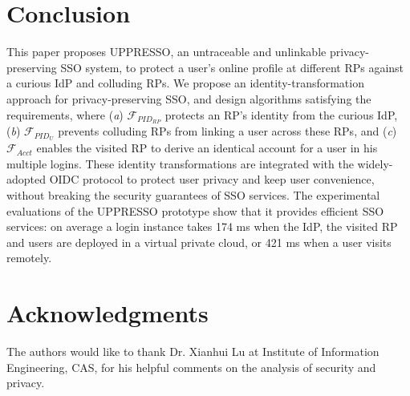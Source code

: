 \section{Conclusion}
\label{sec:conclusion}
This paper proposes UPPRESSO, an untraceable and unlinkable privacy-preserving SSO system,
 to protect a user's online profile at different RPs against a curious IdP and colluding RPs.
We propose an identity-transformation approach for privacy-preserving SSO,
 and design algorithms satisfying the requirements,
 where (\emph{a}) $\mathcal{F}_{PID_{RP}}$ protects an RP's identity from the curious IdP,
(\emph{b})  $\mathcal{F}_{PID_{U}}$ prevents colluding RPs from linking a user across these RPs,
 and (\emph{c}) $\mathcal{F}_{Acct}$ enables the visited RP to derive an identical account for a user in his multiple logins.
These identity transformations are integrated with the widely-adopted OIDC protocol
    to protect user privacy and keep user convenience,
    without breaking the security guarantees of SSO services.
The experimental evaluations of the UPPRESSO prototype show
 that it provides efficient SSO services:
  on average a login instance takes 174 ms when the IdP, the visited RP and users are deployed in a virtual private cloud, or 421 ms when a user visits remotely.

\section*{Acknowledgments}
The authors would like to thank Dr. Xianhui Lu at Institute of Information Engineering, CAS,
    for his helpful comments on the analysis of security and privacy.
